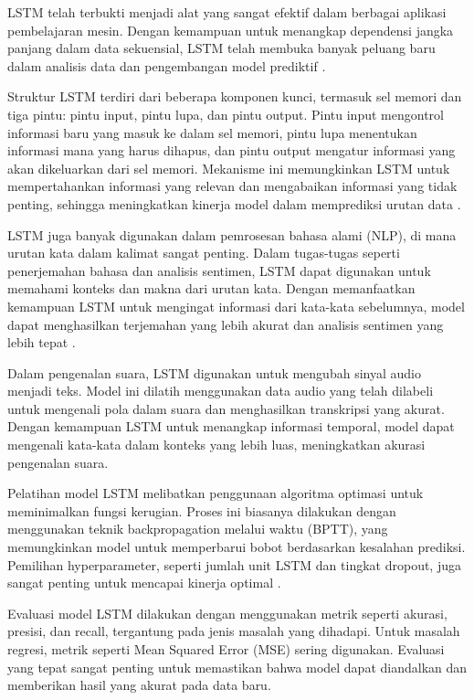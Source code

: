 LSTM telah terbukti menjadi alat yang sangat efektif dalam berbagai aplikasi pembelajaran mesin. Dengan kemampuan untuk menangkap dependensi jangka panjang dalam data sekuensial, LSTM telah membuka banyak peluang baru dalam analisis data dan pengembangan model prediktif \cite{graves2013}.

Struktur LSTM terdiri dari beberapa komponen kunci, termasuk sel memori dan tiga pintu: pintu input, pintu lupa, dan pintu output. Pintu input mengontrol informasi baru yang masuk ke dalam sel memori, pintu lupa menentukan informasi mana yang harus dihapus, dan pintu output mengatur informasi yang akan dikeluarkan dari sel memori. Mekanisme ini memungkinkan LSTM untuk mempertahankan informasi yang relevan dan mengabaikan informasi yang tidak penting, sehingga meningkatkan kinerja model dalam memprediksi urutan data \cite{graves2013}.

LSTM juga banyak digunakan dalam pemrosesan bahasa alami (NLP), di mana urutan kata dalam kalimat sangat penting. Dalam tugas-tugas seperti penerjemahan bahasa dan analisis sentimen, LSTM dapat digunakan untuk memahami konteks dan makna dari urutan kata. Dengan memanfaatkan kemampuan LSTM untuk mengingat informasi dari kata-kata sebelumnya, model dapat menghasilkan terjemahan yang lebih akurat dan analisis sentimen yang lebih tepat \cite{zhang2019}.

Dalam pengenalan suara, LSTM digunakan untuk mengubah sinyal audio menjadi teks. Model ini dilatih menggunakan data audio yang telah dilabeli untuk mengenali pola dalam suara dan menghasilkan transkripsi yang akurat. Dengan kemampuan LSTM untuk menangkap informasi temporal, model dapat mengenali kata-kata dalam konteks yang lebih luas, meningkatkan akurasi pengenalan suara.

Pelatihan model LSTM melibatkan penggunaan algoritma optimasi untuk meminimalkan fungsi kerugian. Proses ini biasanya dilakukan dengan menggunakan teknik backpropagation melalui waktu (BPTT), yang memungkinkan model untuk memperbarui bobot berdasarkan kesalahan prediksi. Pemilihan hyperparameter, seperti jumlah unit LSTM dan tingkat dropout, juga sangat penting untuk mencapai kinerja optimal \cite{bengio2012}.

Evaluasi model LSTM dilakukan dengan menggunakan metrik seperti akurasi, presisi, dan recall, tergantung pada jenis masalah yang dihadapi. Untuk masalah regresi, metrik seperti Mean Squared Error (MSE) sering digunakan. Evaluasi yang tepat sangat penting untuk memastikan bahwa model dapat diandalkan dan memberikan hasil yang akurat pada data baru.

